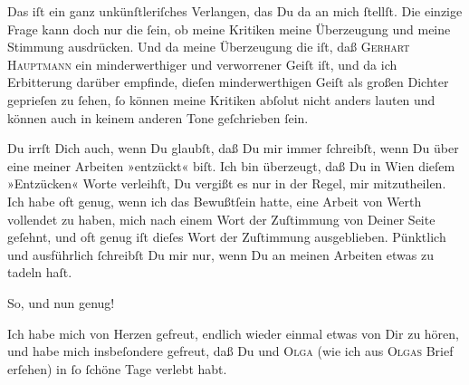                Das iſt \strikeout{\textcolor{gray}{doch}} ein ganz unkünſtleriſches Verlangen, das Du da an mich{ }ſtellſt. Die einzige
               Frage kann doch nur die{ }ſein, ob meine Kritiken meine Überzeugung und meine Stimmung
               ausdrücken. Und da meine Überzeugung die iſt, daß \textsc{Gerhart Hauptmann} ein minderwerthiger {\pb}und verworrener Geiſt
               iſt, und da ich Erbitterung darüber empfinde, dieſen minderwerthigen Geiſt als großen Dichter
               geprieſen zu{ }ſehen,{ }ſo \strikeout{\textcolor{gray}{ſ}} können meine Kritiken abſolut nicht anders lauten und können auch in keinem
               anderen Tone geſchrieben{ }ſein.\pend
           
\pstart
           Du irrſt Dich auch, wenn Du glaubſt, daß Du mir immer{ }ſchreibſt, wenn Du über eine
               meiner Arbeiten »entzückt« biſt. Ich bin überzeugt, daß Du in Wien dieſem »Entzücken« Worte verleihſt, Du vergißt es nur in
               der {\pb}Regel, mir mitzutheilen. Ich habe oft genug, wenn
               ich das Bewußtſein hatte, eine Arbeit von Werth vollendet zu haben, mich nach einem
               Wort der Zuſtimmung von Deiner Seite geſehnt, und oft genug iſt dieſes Wort der
               Zuſtimmung ausgeblieben. Pünktlich und ausführlich{ }ſchreibſt Du mir nur, wenn Du an
               meinen Arbeiten etwas zu tadeln haſt.\pend
           
\pstart
           So, und nun genug!\pend
           
\pstart
           Ich habe mich von Herzen gefreut, endlich wieder einmal etwas von Dir zu hören, und
               habe mich insbeſondere gefreut, {\pb}daß Du und \textsc{Olga} (wie ich aus \textsc{Olgas} Brief erſehen) in \label{K_L03091-4v}\label{K_L03091-4}{ }ſo{ }ſchöne Tage
               verlebt habt.\pend
           
